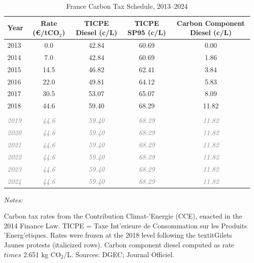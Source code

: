 \begin{table}[!h]
\centering
\caption{France Carbon Tax Schedule, 2013--2024}
\centering
\fontsize{10}{12}\selectfont
\begin{threeparttable}
\begin{tabular}[t]{lcccc}
\toprule
Year & Rate (\euro/tCO$_2$) & TICPE Diesel (c/L) & TICPE SP95 (c/L) & Carbon Component Diesel (c/L)\\
\midrule
2013 & 0.0 & 42.84 & 60.69 & 0.00\\
2014 & 7.0 & 42.84 & 60.69 & 1.86\\
2015 & 14.5 & 46.82 & 62.41 & 3.84\\
2016 & 22.0 & 49.81 & 64.12 & 5.83\\
2017 & 30.5 & 53.07 & 65.07 & 8.09\\
2018 & 44.6 & 59.40 & 68.29 & 11.82\\
\midrule\\
\textcolor{gray}{\em{2019}} & \textcolor{gray}{\em{44.6}} & \textcolor{gray}{\em{59.40}} & \textcolor{gray}{\em{68.29}} & \textcolor{gray}{\em{11.82}}\\
\textcolor{gray}{\em{2020}} & \textcolor{gray}{\em{44.6}} & \textcolor{gray}{\em{59.40}} & \textcolor{gray}{\em{68.29}} & \textcolor{gray}{\em{11.82}}\\
\textcolor{gray}{\em{2021}} & \textcolor{gray}{\em{44.6}} & \textcolor{gray}{\em{59.40}} & \textcolor{gray}{\em{68.29}} & \textcolor{gray}{\em{11.82}}\\
\textcolor{gray}{\em{2022}} & \textcolor{gray}{\em{44.6}} & \textcolor{gray}{\em{59.40}} & \textcolor{gray}{\em{68.29}} & \textcolor{gray}{\em{11.82}}\\
\textcolor{gray}{\em{2023}} & \textcolor{gray}{\em{44.6}} & \textcolor{gray}{\em{59.40}} & \textcolor{gray}{\em{68.29}} & \textcolor{gray}{\em{11.82}}\\
\textcolor{gray}{\em{2024}} & \textcolor{gray}{\em{44.6}} & \textcolor{gray}{\em{59.40}} & \textcolor{gray}{\em{68.29}} & \textcolor{gray}{\em{11.82}}\\
\bottomrule
\end{tabular}
\begin{tablenotes}
\item \textit{Notes:} 
\item Carbon tax rates from the Contribution Climat-'{E}nergie (CCE), enacted in the 2014 Finance Law. TICPE = Taxe Int'{e}rieure de Consommation sur les Produits '{E}nerg'{e}tiques. Rates were frozen at the 2018 level following the textit{Gilets Jaunes} protests (italicized rows). Carbon component diesel computed as rate $times$ 2.651 kg CO$_2$/L. Sources: DGEC; Journal Officiel.
\end{tablenotes}
\end{threeparttable}
\end{table}
